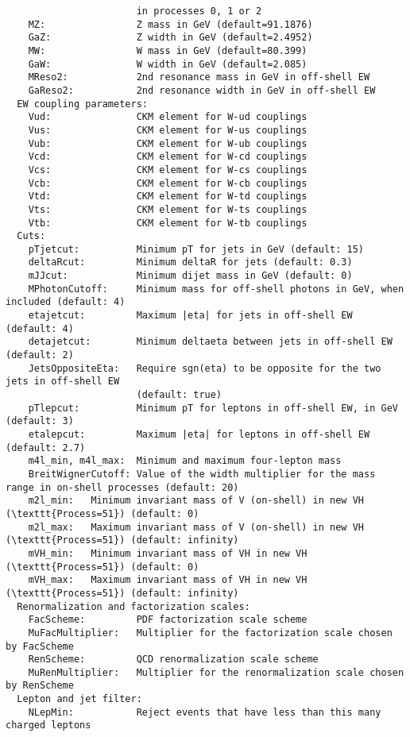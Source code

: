 \documentclass[aps,superscriptaddress,nofootinbib]{revtex4}
\begin{document}
\begin{verbatim}
                       in processes 0, 1 or 2
    MZ:                Z mass in GeV (default=91.1876)
    GaZ:               Z width in GeV (default=2.4952)
    MW:                W mass in GeV (default=80.399)
    GaW:               W width in GeV (default=2.085)
    MReso2:            2nd resonance mass in GeV in off-shell EW
    GaReso2:           2nd resonance width in GeV in off-shell EW
  EW coupling parameters:
    Vud:               CKM element for W-ud couplings
    Vus:               CKM element for W-us couplings
    Vub:               CKM element for W-ub couplings
    Vcd:               CKM element for W-cd couplings
    Vcs:               CKM element for W-cs couplings
    Vcb:               CKM element for W-cb couplings
    Vtd:               CKM element for W-td couplings
    Vts:               CKM element for W-ts couplings
    Vtb:               CKM element for W-tb couplings
  Cuts:
    pTjetcut:          Minimum pT for jets in GeV (default: 15)
    deltaRcut:         Minimum deltaR for jets (default: 0.3)
    mJJcut:            Minimum dijet mass in GeV (default: 0)
    MPhotonCutoff:     Minimum mass for off-shell photons in GeV, when included (default: 4)
    etajetcut:         Maximum |eta| for jets in off-shell EW (default: 4)
    detajetcut:        Minimum deltaeta between jets in off-shell EW (default: 2)
    JetsOppositeEta:   Require sgn(eta) to be opposite for the two jets in off-shell EW
                       (default: true)
    pTlepcut:          Minimum pT for leptons in off-shell EW, in GeV (default: 3)
    etalepcut:         Maximum |eta| for leptons in off-shell EW (default: 2.7)
    m4l_min, m4l_max:  Minimum and maximum four-lepton mass 
    BreitWignerCutoff: Value of the width multiplier for the mass range in on-shell processes (default: 20) 
    m2l_min:   Minimum invariant mass of V (on-shell) in new VH (\texttt{Process=51}) (default: 0)
    m2l_max:   Maximum invariant mass of V (on-shell) in new VH (\texttt{Process=51}) (default: infinity)
    mVH_min:   Minimum invariant mass of VH in new VH (\texttt{Process=51}) (default: 0)
    mVH_max:   Maximum invariant mass of VH in new VH (\texttt{Process=51}) (default: infinity)
  Renormalization and factorization scales:
    FacScheme:         PDF factorization scale scheme
    MuFacMultiplier:   Multiplier for the factorization scale chosen by FacScheme
    RenScheme:         QCD renormalization scale scheme
    MuRenMultiplier:   Multiplier for the renormalization scale chosen by RenScheme
  Lepton and jet filter:
    NLepMin:           Reject events that have less than this many charged leptons

\end{verbatim}
\end{document}
